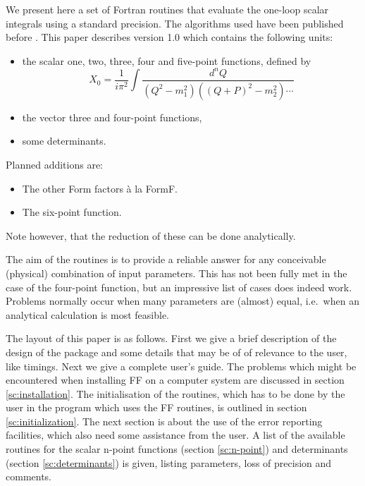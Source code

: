 \documentclass[twoside,12pt]{report}
\begin{document}
\begin{appendix}
We present here a set of Fortran routines that evaluate the one-loop scalar 
integrals using a standard precision.  The algorithms used have been published 
before \cite{vOV90}.  This paper describes version 1.0 which contains 
the following units:
\begin{itemize}
\item the scalar one, two, three, four and five-point functions, defined by
\begin{equation}
	X_0 = \frac{1}{i\pi^2} \int \!\!\frac{d^n Q}{(Q^2 - m_1^2)((Q+P)^2 - m_2^2)\cdots}
\end{equation}
\item the vector three and four-point functions,
\item some determinants.
\end{itemize}
Planned additions are:
\begin{itemize}
\item The other Form factors \`{a} la FormF.
\item The six-point function.
\end{itemize}
Note however, that the reduction of these can be done analytically.  

The aim of the routines is to provide a reliable answer for any conceivable 
(physical) combination of input parameters.  This has not been fully met in 
the case of the four-point function, but an impressive list of cases does 
indeed work.  Problems normally occur when many parameters are (almost) 
equal, i.e.\ when an analytical calculation is most feasible.

The layout of this paper is as follows.  First we give a brief description of 
the design of the package and some details that may be of of relevance to the 
user, like timings.  Next we give a complete user's guide.  The problems which 
might be encountered when installing FF on a computer system are discussed in 
section \ref{sc:installation}.  The initialisation of the routines, which has 
to be done by the user in the program which uses the FF routines, is outlined 
in section \ref{sc:initialization}.  The next section is about the use of the 
error reporting facilities, which also need some assistance from the user.  A 
list of the available routines for the scalar n-point functions (section 
\ref{sc:n-point}) and determinants (section \ref{sc:determinants}) is given, 
listing parameters, loss of precision and comments.



\end{appendix}
\end{document}
